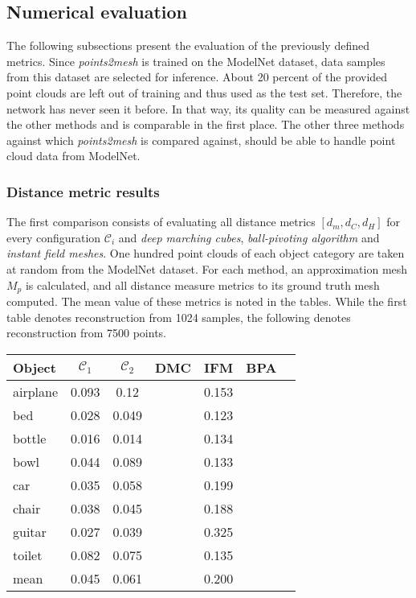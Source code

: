 \subsection{Numerical evaluation}
\label{numericeval}
    The following subsections present the evaluation of the previously defined metrics. Since \emph{points2mesh} 
    is trained on the ModelNet dataset, data samples from this dataset are selected for inference. About 20 percent 
    of the provided point clouds are left out of training and thus used as the test set. Therefore, the network has 
    never seen it before. In that way, its quality can be measured against the other methods and is comparable in the
    first place. The other three methods against which \emph{points2mesh} is compared against, should be able to handle
    point cloud data from ModelNet.
\subsubsection*{Distance metric results}
    The first comparison consists of evaluating all distance metrics $[d_m, d_C, d_H]$ for every configuration
    $\mathcal{C}_i$ and \emph{deep marching cubes}, \emph{ball-pivoting algorithm} and \emph{instant field meshes}.
    One hundred point clouds of each object category are taken at random from the ModelNet dataset. For each method,
    an approximation mesh $M_{p}$ is calculated, and all distance measure metrics to its ground truth mesh computed.
    The mean value of these metrics is noted in the tables. While the first table denotes reconstruction from 1024 
    samples, the following denotes reconstruction from 7500 points.
\begin{center}
     \label{tab:distance1024} 
    \begin{tabular}{| l  | c  | c | c | c | c | c |}
        \hline
        Object& $\mathcal{C}_1$ & $\mathcal{C}_2$ & DMC & IFM & BPA \\ \hline
        \multirow{1}{*}{airplane}&0.093&0.12&&0.153&\\\hline
        \multirow{1}{*}{bed}&0.028&0.049&&0.123&\\\hline 
        \multirow{1}{*}{bottle}&0.016&0.014&&0.134&\\\hline
        \multirow{1}{*}{bowl}&0.044&0.089&&0.133&\\\hline
        \multirow{1}{*}{car}&0.035&0.058&&0.199&\\\hline
        \multirow{1}{*}{chair}&0.038&0.045&&0.188&\\\hline
        \multirow{1}{*}{guitar}&0.027&0.039&&0.325&\\\hline
        \multirow{1}{*}{toilet}&0.082&0.075&&0.135&\\\hline\hline
        \multirow{1}{*}{mean}&0.045&0.061&&0.200&\\        \hline
    \end{tabular}
\end{center}
